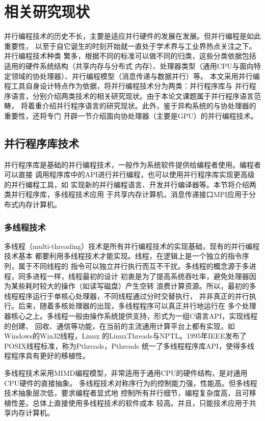 \chapter{相关研究现状}
并行编程技术的历史不长，主要是适应并行硬件的发展在发展。但并行编程是如此重要性，
以至于自它诞生的时刻开始就一直处于学术界与工业界热点关注之下。并行编程技术种类
繁多，根据不同的标准可以做不同的归类，这些分类依据包括适用的硬件系统结构（共享内存与分布式
内存）、处理器类型（通用CPU与面向特定领域的协处理器）、并行编程模型（消息传递与数据并行）等。
本文采用并行编程工具自身设计特点作为依据，将并行编程技术分为两类：并行程序库与
并行程序语言，分别介绍两类技术的相关研究现状。由于本论文课题属于并行程序语言范畴，
将着重介绍并行程序语言的研究现状。此外，鉴于异构系统的与协处理器的重要性，还将专门
开辟一节介绍面向协处理器（主要是GPU）的并行编程技术。

\section{并行程序库技术}
并行程序库是基础的并行编程技术，一般作为系统软件提供给编程者使用。编程者可以直接
调用程序库中的API进行并行编程，也可以使用并行程序库实现更高级的并行编程工具，如
实现新的并行编程语言、开发并行编译器等。本节将介绍两类并行程序库，多线程技术应用
于共享内存计算机，消息传递接口MPI应用于分布式内存计算机。

\subsection{多线程技术}
多线程（multi-threading）技术是所有并行编程技术的实现基础，现有的并行编程技术基本
都要利用多线程技术才能实现。线程，在逻辑上是一个独立的指令序列，属于不同线程的
指令可以独立并行执行而互不干扰。多线程的概念源于多进程，同多进程一样，线程最初的设计
初衷是为了提高系统吞吐率，避免处理器因为某些耗时较大的操作（如读写磁盘）产生空转
浪费计算资源。所以，最初的多线程程序运行于单核心处理器，不同线程通过分时交替执行，
并非真正的并行执行。后来，随着多核处理器的出现，多线程程序可以真正并行地运行在
多个处理器核心之上。多线程一般由操作系统提供支持，形式为一组C语言API，实现线程的创建、
回收、通信等功能，在当前的主流通用计算平台上都有实现，如Windows的Win32线程，Linux
的LinuxThreads与NPTL。1995年IEEE发布了POSIX线程标准，称为Pthreads，Pthreads
统一了多线程程序库API，使得多线程程序具有更好的移植性。

多线程技术采用MIMD编程模型，非常适用于通用CPU的硬件结构，是对通用CPU硬件的直接抽象。
多线程技术对称序行为的控制能力强，性能高。但多线程技术抽象层次低，要求编程者显式地
控制所有并行细节，编程复杂度高，且可移植性差。总体上直接使用多线程技术的软件成本
较高。并且，只能技术应用于共享内存计算机。

